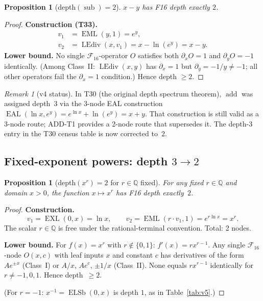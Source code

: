 \documentclass[12pt,a4paper]{article}
\newtheorem{proposition}[theorem]{Proposition}
\theoremstyle{definition}
\theoremstyle{remark}
\newtheorem{remark}[theorem]{Remark}
\newcommand{\EML}{\operatorname{EML}}
\newcommand{\EXL}{\operatorname{EXL}}
\newcommand{\EAL}{\operatorname{EAL}}
\newcommand{\ELSb}{\operatorname{ELSb}}
\newcommand{\LEdiv}{\operatorname{LEdiv}}
\newcommand{\addop}{\operatorname{add}}
\newcommand{\subop}{\operatorname{sub}}
\newcommand{\F}{\mathcal{F}_{16}}
\newcommand{\Q}{\mathbb{Q}}
\begin{document}
\begin{proposition}[depth$(\subop) = 2$]
$x - y$ has F16 depth exactly $2$.
\end{proposition}

\begin{proof}
\textbf{Construction (T33).}
\begin{align*}
  v_1 &= \EML(y,1) = e^y, \\
  v_2 &= \LEdiv(x, v_1) = x - \ln(e^y) = x - y.
\end{align*}
\textbf{Lower bound.}  No single $\F$-operator $O$ satisfies both $\partial_x O = 1$ and $\partial_y O = -1$
identically.  (Among Class~II: $\LEdiv(x,y)$ has $\partial_x = 1$ but $\partial_y = -1/y \neq -1$;
all other operators fail the $\partial_x = 1$ condition.)  Hence depth $\geq 2$.
\end{proof}

\begin{remark}[v4 status]
In T30 (the original depth spectrum theorem), $\addop$ was assigned depth~$3$
via the $3$-node EAL construction $\EAL(\ln x, e^y) = e^{\ln x} + \ln(e^y) = x + y$.
That construction is still valid as a 3-node route; ADD-T1 provides a 2-node route
that supersedes it.  The depth-3 entry in the T30 census table is now corrected to~$2$.
\end{remark}

\subsection{Fixed-exponent powers: depth $3 \to 2$}

\begin{proposition}[depth$(x^r) = 2$ for $r\in\Q$ fixed]
\label{prop:fixedpow}
For any fixed $r \in \Q$ and domain $x > 0$, the function $x \mapsto x^r$
has F16 depth exactly~$2$.
\end{proposition}

\begin{proof}
\textbf{Construction.}
\[
  v_1 = \EXL(0,x) = \ln x, \qquad
  v_2 = \EML(r \cdot v_1, 1) = e^{r \ln x} = x^r.
\]
The scalar $r\in\Q$ is free under the rational-terminal convention.  Total: 2 nodes.

\textbf{Lower bound.}  For $f(x) = x^r$ with $r \notin \{0,1\}$:
$f'(x) = r x^{r-1}$.  Any single $\F$-node $O(x, c)$ with leaf inputs $x$ and
constant $c$ has derivatives of the form $Ae^{\pm x}$ (Class~I) or
$A/x$, $Ae^c$, $\pm 1/x$ (Class~II).  None equals $rx^{r-1}$ identically for
$r \neq -1, 0, 1$.  Hence depth~$\geq 2$.

(For $r=-1$: $x^{-1} = \ELSb(0,x)$ is depth $1$, as in Table~\ref{tab:v5}.)
\end{proof}
\end{document}
